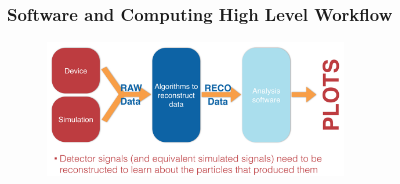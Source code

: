 \begin{frame}
\frametitle{Software and Computing High Level Workflow}

\begin{figure}[htbp]
\begin{center}
\includegraphics[width=0.7\textwidth]{images/workflow-high-level.png}
\end{center}
\end{figure}


\end{frame}


